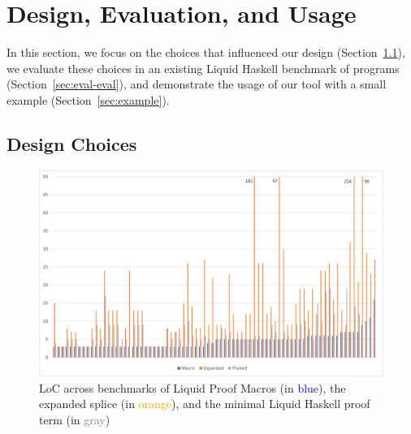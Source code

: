 \section{Design, Evaluation, and Usage}
\label{sec:eval}

In this section, we focus on the choices that influenced our design
(Section~\ref{sec:design}), we evaluate these choices in an existing
Liquid Haskell benchmark of programs (Section~\ref{sec:eval-eval}),
and demonstrate the usage of our tool with a small example
(Section~\ref{sec:example}).

\subsection{Design Choices}
\label{sec:design}

\begin{figure}
  \includegraphics[width=\textwidth]{LiquidProofEval.png}
  \caption{LoC across benchmarks of Liquid Proof Macros (in \textcolor{blue}{blue}), the expanded splice (in \textcolor{orange}{orange}), and the minimal
    Liquid Haskell proof term (in \textcolor{gray}{gray})}
  \label{fig:loc-eval}
\end{figure}



